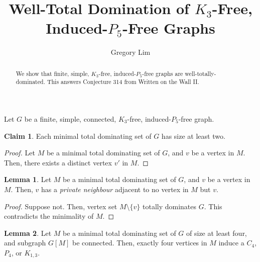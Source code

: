 \documentclass{amsart}
\title{Well-Total Domination of $K_{3}$-Free, Induced-$P_{5}$-Free Graphs}
\author{Gregory Lim}
\date{}
\theoremstyle{definition}
\newtheorem{claim}{Claim}
\newtheorem*{lemma*}{Lemma}
\begin{document}
\begin{abstract}
	We show that finite, simple, $K_{3}$-free, induced-$P_{5}$-free graphs are well-totally-dominated.
	This answers Conjecture 314 from Written on the Wall II.
\end{abstract}

\maketitle

Let $G$ be a finite, simple, connected, $K_{3}$-free, induced-$P_{5}$-free graph.

\begin{claim}
Each minimal total dominating set of $G$ has size at least two.
\end{claim}

\begin{proof}
Let $M$ be a minimal total dominating set of $G$,
and $v$ be a vertex in $M$.
Then, there exists a distinct vertex $v'$ in $M$.
\end{proof}

\begin{lemma*}
Let $M$ be a minimal total dominating set of $G$,
and $v$ be a vertex in $M$.
Then, $v$ has a \textit{private neighbour} adjacent to no vertex in $M$ but $v$.
\end{lemma*}

\begin{proof}
Suppose not.
Then, vertex set $M\setminus\{v\}$ totally dominates $G$.
This contradicts the minimality of $M$.
\end{proof}

\begin{lemma*}
Let $M$ be a minimal total dominating set of $G$ of size at least four, and subgraph $G[M]$ be connected.
Then, exactly four vertices in $M$ induce a $C_{4}$, $P_{4}$, or $K_{1,3}$.
\end{lemma*}
\end{document}

